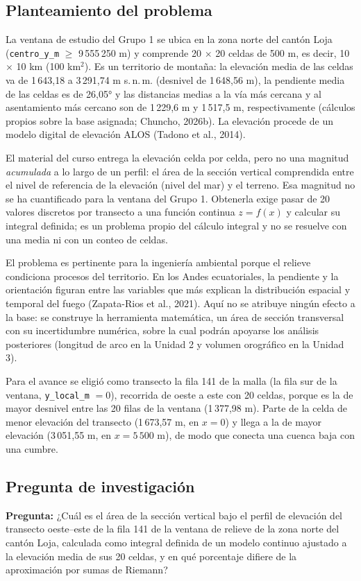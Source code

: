 \documentclass[11pt,a4paper]{article}
\begin{document}
\subsection{Planteamiento del problema}
La ventana de estudio del Grupo 1 se ubica en la zona norte del cantón Loja (\texttt{centro\_y\_m} $\geq$ 9\,555\,250 m) y comprende 20 $\times$ 20 celdas de 500 m, es decir, 10 $\times$ 10 km (100 km$^2$). Es un territorio de montaña: la elevación media de las celdas va de 1\,643,18 a 3\,291,74 m s.\,n.\,m. (desnivel de 1\,648,56 m), la pendiente media de las celdas es de 26,05° y las distancias medias a la vía más cercana y al asentamiento más cercano son de 1\,229,6 m y 1\,517,5 m, respectivamente (cálculos propios sobre la base asignada; Chuncho, 2026b). La elevación procede de un modelo digital de elevación ALOS (Tadono et al., 2014).

El material del curso entrega la elevación celda por celda, pero no una magnitud \emph{acumulada} a lo largo de un perfil: el área de la sección vertical comprendida entre el nivel de referencia de la elevación (nivel del mar) y el terreno. Esa magnitud no se ha cuantificado para la ventana del Grupo 1. Obtenerla exige pasar de 20 valores discretos por transecto a una función continua $z = f(x)$ y calcular su integral definida; es un problema propio del cálculo integral y no se resuelve con una media ni con un conteo de celdas.

El problema es pertinente para la ingeniería ambiental porque el relieve condiciona procesos del territorio. En los Andes ecuatoriales, la pendiente y la orientación figuran entre las variables que más explican la distribución espacial y temporal del fuego (Zapata-Rios et al., 2021). Aquí no se atribuye ningún efecto a la base: se construye la herramienta matemática, un área de sección transversal con su incertidumbre numérica, sobre la cual podrán apoyarse los análisis posteriores (longitud de arco en la Unidad 2 y volumen orográfico en la Unidad 3).

Para el avance se eligió como transecto la fila 141 de la malla (la fila sur de la ventana, \texttt{y\_local\_m} $= 0$), recorrida de oeste a este con 20 celdas, porque es la de mayor desnivel entre las 20 filas de la ventana (1\,377,98 m). Parte de la celda de menor elevación del transecto (1\,673,57 m, en $x = 0$) y llega a la de mayor elevación (3\,051,55 m, en $x = 5\,500$ m), de modo que conecta una cuenca baja con una cumbre.

\subsection{Pregunta de investigación}
\textbf{Pregunta:} ¿Cuál es el área de la sección vertical bajo el perfil de elevación del transecto oeste--este de la fila 141 de la ventana de relieve de la zona norte del cantón Loja, calculada como integral definida de un modelo continuo ajustado a la elevación media de sus 20 celdas, y en qué porcentaje difiere de la aproximación por sumas de Riemann?
\end{document}
